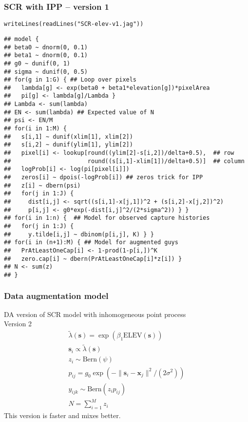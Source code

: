 \documentclass[color=usenames,dvipsnames]{beamer}\usepackage[]{graphicx}\usepackage[]{color}
\makeatletter
\newcommand{\hlstr}[1]{\textcolor[rgb]{0.749,0.012,0.012}{#1}}%
\newcommand{\hlstd}[1]{\textcolor[rgb]{0,0,0}{#1}}%
\newcommand{\hlkwd}[1]{\textcolor[rgb]{0.004,0.004,0.506}{#1}}%
\newenvironment{kframe}{%
 \def\at@end@of@kframe{}%
 \ifinner\ifhmode%
  \def\at@end@of@kframe{\end{minipage}}%
  \begin{minipage}{\columnwidth}%
 \fi\fi%
 \def\FrameCommand##1{\hskip\@totalleftmargin \hskip-\fboxsep
 \colorbox{shadecolor}{##1}\hskip-\fboxsep
     \hskip-\linewidth \hskip-\@totalleftmargin \hskip\columnwidth}%
 \MakeFramed {\advance\hsize-\width
   \@totalleftmargin\z@ \linewidth\hsize
   \@setminipage}}%
 {\par\unskip\endMakeFramed%
 \at@end@of@kframe}
\newenvironment{knitrout}{}{} %
\newcommand{\bxj}{{\bm x}_j}
\newcommand{\bs}{{\bm s}}
\newcommand{\bsi}{{\bm s}_i}
\makeatother
\begin{document}
\begin{frame}[fragile]
  \frametitle{SCR with IPP -- version 1}
  \vspace{-3pt}
\begin{knitrout}\tiny
{}\color{fgcolor}\begin{kframe}
\begin{alltt}
\hlkwd{writeLines}\hlstd{(}\hlkwd{readLines}\hlstd{(}\hlstr{"SCR-elev-v1.jag"}\hlstd{))}
\end{alltt}
\begin{verbatim}
## model {
## beta0 ~ dnorm(0, 0.1)
## beta1 ~ dnorm(0, 0.1)
## g0 ~ dunif(0, 1)
## sigma ~ dunif(0, 0.5)
## for(g in 1:G) { ## Loop over pixels
##   lambda[g] <- exp(beta0 + beta1*elevation[g])*pixelArea
##   pi[g] <- lambda[g]/Lambda }
## Lambda <- sum(lambda)
## EN <- sum(lambda) ## Expected value of N
## psi <- EN/M
## for(i in 1:M) {
##   s[i,1] ~ dunif(xlim[1], xlim[2]) 
##   s[i,2] ~ dunif(ylim[1], ylim[2])
##   pixel[i] <- lookup[round((ylim[2]-s[i,2])/delta+0.5),  ## row
##                      round((s[i,1]-xlim[1])/delta+0.5)]  ## column
##   logProb[i] <- log(pi[pixel[i]])
##   zeros[i] ~ dpois(-logProb[i]) ## zeros trick for IPP
##   z[i] ~ dbern(psi)
##   for(j in 1:J) {
##     dist[i,j] <- sqrt((s[i,1]-x[j,1])^2 + (s[i,2]-x[j,2])^2)
##     p[i,j] <- g0*exp(-dist[i,j]^2/(2*sigma^2)) } }
## for(i in 1:n) {  ## Model for observed capture histories
##   for(j in 1:J) {
##     y.tilde[i,j] ~ dbinom(p[i,j], K) } }
## for(i in (n+1):M) { ## Model for augmented guys
##   PrAtLeastOneCap[i] <- 1-prod(1-p[i,])^K
##   zero.cap[i] ~ dbern(PrAtLeastOneCap[i]*z[i]) }
## N <- sum(z)
## }
\end{verbatim}
\end{kframe}
\end{knitrout}
\end{frame}





\begin{frame}
  \frametitle{Data augmentation model}
  DA version of SCR model with inhomogeneous point process \\
  \centering
  Version 2 \\
  \begin{gather*}
    \tilde{\lambda}(\bs) = \exp(\beta_1 \mathrm{ELEV}(\bs)) \\
    \bsi \propto \tilde{\lambda}(\bs) \\
    z_i \sim \mathrm{Bern}(\psi) \\
    p_{ij} = g_0\exp(-\|\bsi-\bxj\|^2/(2\sigma^2)) \\
    y_{ijk} \sim \mathrm{Bern}(z_i p_{ij}) \\
    N=\sum_{i=1}^M z_i
  \end{gather*}
  This version is faster and mixes better. \\
\end{frame}
\end{document}
